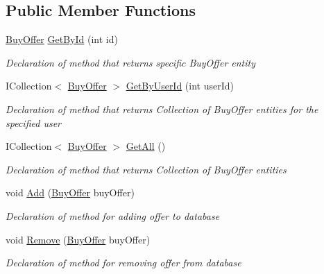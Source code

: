 \subsection*{Public Member Functions}
\begin{DoxyCompactItemize}
\item 
\mbox{\hyperlink{class_gielda_l2_1_1_d_b_1_1_entities_1_1_buy_offer}{Buy\+Offer}} \mbox{\hyperlink{interface_gielda_l2_1_1_d_b_1_1_interfaces_1_1_i_buy_offer_repository_ac7c415d55971e7a12d1f8d2c96d3d3e2}{Get\+By\+Id}} (int id)
\begin{DoxyCompactList}\small\item\em Declaration of method that returns specific Buy\+Offer entity \end{DoxyCompactList}\item 
I\+Collection$<$ \mbox{\hyperlink{class_gielda_l2_1_1_d_b_1_1_entities_1_1_buy_offer}{Buy\+Offer}} $>$ \mbox{\hyperlink{interface_gielda_l2_1_1_d_b_1_1_interfaces_1_1_i_buy_offer_repository_a65cd54e2405e6121a0e1d7bb91184337}{Get\+By\+User\+Id}} (int user\+Id)
\begin{DoxyCompactList}\small\item\em Declaration of method that returns Collection of Buy\+Offer entities for the specified user \end{DoxyCompactList}\item 
I\+Collection$<$ \mbox{\hyperlink{class_gielda_l2_1_1_d_b_1_1_entities_1_1_buy_offer}{Buy\+Offer}} $>$ \mbox{\hyperlink{interface_gielda_l2_1_1_d_b_1_1_interfaces_1_1_i_buy_offer_repository_aa086036b9ec0331e455c846193679851}{Get\+All}} ()
\begin{DoxyCompactList}\small\item\em Declaration of method that returns Collection of Buy\+Offer entities \end{DoxyCompactList}\item 
void \mbox{\hyperlink{interface_gielda_l2_1_1_d_b_1_1_interfaces_1_1_i_buy_offer_repository_aae66f2818cb5476f701c68266e413d87}{Add}} (\mbox{\hyperlink{class_gielda_l2_1_1_d_b_1_1_entities_1_1_buy_offer}{Buy\+Offer}} buy\+Offer)
\begin{DoxyCompactList}\small\item\em Declaration of method for adding offer to database \end{DoxyCompactList}\item 
void \mbox{\hyperlink{interface_gielda_l2_1_1_d_b_1_1_interfaces_1_1_i_buy_offer_repository_af9d25dfd52c71cc21dd7a89bf54f2ee4}{Remove}} (\mbox{\hyperlink{class_gielda_l2_1_1_d_b_1_1_entities_1_1_buy_offer}{Buy\+Offer}} buy\+Offer)
\begin{DoxyCompactList}\small\item\em Declaration of method for removing offer from database \end{DoxyCompactList}\end{DoxyCompactItemize}

